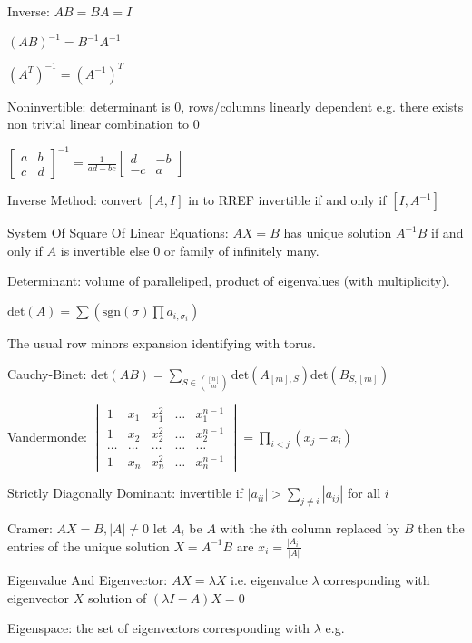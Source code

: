 Inverse: $AB=BA=I$

$(AB)^{-1}=B^{-1}A^{-1}$

$(A^T)^{-1}=(A^{-1})^T$

Noninvertible: determinant is $0$, rows/columns linearly dependent e.g. there exists non trivial linear combination to $0$

$\begin{bmatrix} a & b \\ c & d \end{bmatrix}^{-1} = \frac{1}{ad-bc} \begin{bmatrix} d & -b \\ -c & a \end{bmatrix}$

Inverse Method: convert $[A,I]$ in to RREF invertible if and only if $[I,A^{-1}]$

System Of Square Of Linear Equations: $AX=B$ has unique solution $A^{-1}B$ if and only if $A$ is invertible else $0$ or family of infinitely many.

Determinant: volume of paralleliped, product of eigenvalues (with multiplicity).

$\text{det} (A)=\sum \left( \text{sgn} (\sigma) \prod a_{i,\sigma_i} \right)$

The usual row minors expansion identifying with torus.

Cauchy-Binet: $\text{det}(AB)=\sum_{S \in \binom{[n]}{m}}\text{det}(A_{[m],S})\text{det}(B_{S,[m]})$

Vandermonde: $\begin{vmatrix} 1 & x_1 & x_1^2 & \dots & x_1^{n-1} \\ 1 & x_2 & x_2^2 & \dots & x_2^{n-1} \\ \dots & \dots & \dots & \dots & \dots \\ 1 & x_n & x_n^2 & \dots & x_n^{n-1} \end{vmatrix} = \prod_{i<j} (x_j-x_i)$

Strictly Diagonally Dominant: invertible if $|a_{ii}| > \sum_{j \neq i} |a_{ij}|$ for all $i$

Cramer: $AX=B, |A|\neq 0$ let $A_i$ be $A$ with the $i$th column replaced by $B$ then the entries of the unique solution $X=A^{-1}B$ are $x_i=\frac{|A_i|}{|A|}$

Eigenvalue And Eigenvector: $AX=\lambda X$ i.e. eigenvalue $\lambda$ corresponding with eigenvector $X$ solution of $(\lambda I-A)X=0$

Eigenspace: the set of eigenvectors corresponding with $\lambda$ e.g.

